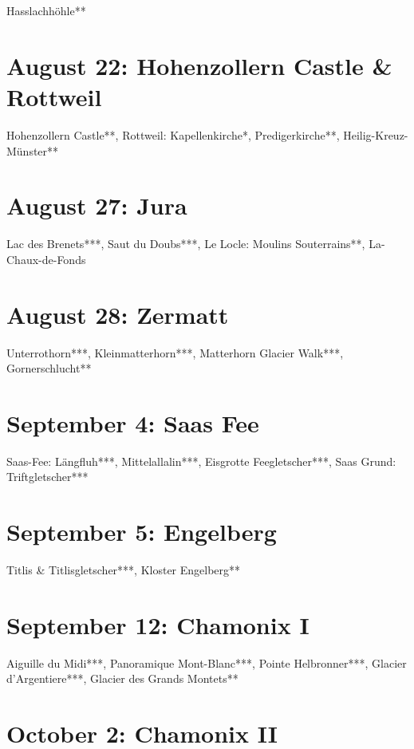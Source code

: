 Hasslachh\"ohle**

\section{August 22: Hohenzollern Castle \& Rottweil}
\label{2010Hohenzollern}

Hohenzollern Castle**, Rottweil: Kapellenkirche*, Predigerkirche**, Heilig-Kreuz-M\"unster**

\section{August 27: Jura}
\label{jura2010}

Lac des Brenets***, Saut du Doubs***, Le Locle: Moulins Souterrains**, La-Chaux-de-Fonds

\section{August 28: Zermatt}
\label{Zermatt2010}

Unterrothorn***, Kleinmatterhorn***, Matterhorn Glacier Walk***, Gornerschlucht**

\section{September 4: Saas Fee}
\label{2010SaasFee}

Saas-Fee: L\"angfluh***, Mittelallalin***, Eisgrotte Feegletscher***, Saas Grund: Triftgletscher***

\section{September 5: Engelberg}
\label{2010Titlis}

Titlis \& Titlisgletscher***, Kloster Engelberg**

\section{September 12: Chamonix I}
\label{2010ChamonixI}

Aiguille du Midi***, Panoramique Mont-Blanc***, Pointe Helbronner***, Glacier d'Argentiere***, Glacier des Grands Montets**

\section{October 2: Chamonix II}
\label{2010ChamonixII}

